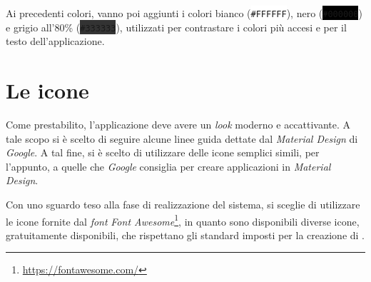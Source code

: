 Ai precedenti colori, vanno poi aggiunti i colori bianco (\colorbox[HTML]{FFFFFF}{\texttt{\#FFFFFF}}), nero (\colorbox{black}{\color{white}\texttt{\#000000}}) e grigio all'80\% (\colorbox[HTML]{333333}{\color{white}\texttt{\#333333}}), utilizzati per contrastare i colori più accesi e per il testo dell'applicazione.

\section{Le icone}

Come prestabilito, l'applicazione deve avere un \emph{look} moderno e accattivante. A tale scopo si è scelto di seguire alcune linee guida dettate dal \emph{Material Design} di \emph{Google}. A tal fine, si è scelto di utilizzare delle icone semplici simili, per l'appunto, a quelle che \emph{Google} consiglia per creare applicazioni in \emph{Material Design}. 

Con uno sguardo teso alla fase di realizzazione del sistema, si sceglie di utilizzare le icone fornite dal \emph{font} \emph{Font Awesome}\footnote{\url{https://fontawesome.com/}}, in quanto sono disponibili diverse icone, gratuitamente disponibili, che rispettano gli standard imposti per la creazione di \ProjectTitle{}.